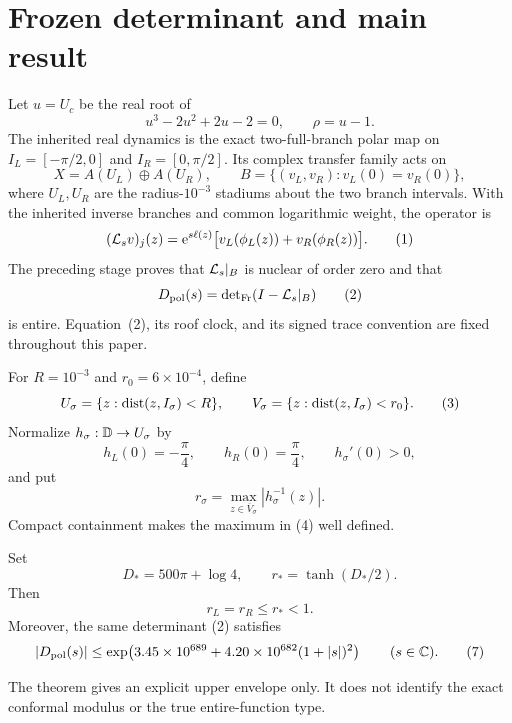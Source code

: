 \section{Frozen determinant and main result}

Let \(u=U_c\) be the real root of
\[
 u^3-2u^2+2u-2=0,
 \qquad \rho=u-1.
\]
The inherited real dynamics is the exact two-full-branch polar map on
\(I_L=[-\pi/2,0]\) and \(I_R=[0,\pi/2]\).  Its complex transfer family acts
on
\[
 X=A(U_L)\oplus A(U_R),
 \qquad
 B=\{(v_L,v_R):v_L(0)=v_R(0)\},
\]
where \(U_L,U_R\) are the radius-\(10^{-3}\) stadiums about the two branch
intervals.  With the inherited inverse branches and common logarithmic
weight, the operator is
\[
 (\mathcal L_s v)_j(z)=\mathrm e^{s\ell(z)}
 \bigl[v_L(\phi_L(z))+v_R(\phi_R(z))\bigr].
 \tag{1}
\]
The preceding stage proves that \(\mathcal L_s|_B\) is nuclear of order zero and
that
\[
 D_{\mathrm{pol}}(s)=\operatorname{det}_{\mathrm{Fr}}(I-\mathcal L_s|_B)
 \tag{2}
\]
is entire.  Equation~(2), its roof clock, and its signed trace convention are
fixed throughout this paper.

For \(R=10^{-3}\) and \(r_0=6\times10^{-4}\), define
\[
 U_\sigma=\{z:\operatorname{dist}(z,I_\sigma)<R\},
 \qquad
 V_\sigma=\{z:\operatorname{dist}(z,I_\sigma)<r_0\}.
 \tag{3}
\]
Normalize \(h_\sigma:\mathbb D\to U_\sigma\) by
\[
 h_L(0)=-\frac\pi4,
 \qquad h_R(0)=\frac\pi4,
 \qquad h_\sigma'(0)>0,
\]
and put
\[
 r_\sigma=\max_{z\in\overline V_\sigma}
 |h_\sigma^{-1}(z)|.
 \tag{4}
\]
Compact containment makes the maximum in (4) well defined.

\begin{theorem}
Set
\[
 D_*=500\pi+\log4,
 \qquad
 r_*=\tanh(D_*/2).
 \tag{5}
\]
Then
\[
 r_L=r_R\le r_*<1.
 \tag{6}
\]
Moreover, the same determinant (2) satisfies
\[
 |D_{\mathrm{pol}}(s)|\le
 \exp\!\left(3.45\times10^{689}
 +4.20\times10^{682}(1+|s|)^2\right)
 \qquad(s\in\mathbb C).
 \tag{7}
\]
\end{theorem}

The theorem gives an explicit upper envelope only.  It does not identify the
exact conformal modulus or the true entire-function type.

